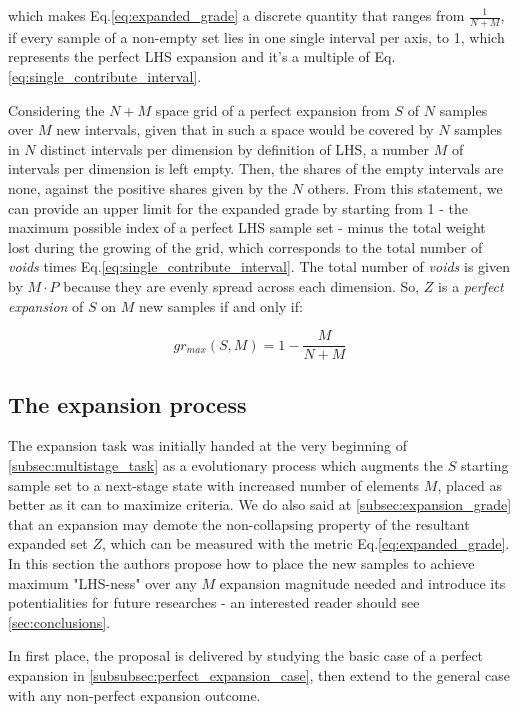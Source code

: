 \documentclass[12pt]{article}
\newcommand{\meqref}[1]{Eq.\ref{#1}}
\begin{document}
which makes \meqref{eq:expanded_grade} a discrete quantity that ranges from $\frac{1}{N+M}$, if every sample of a non-empty set lies in one single interval per axis, to 1, which represents the perfect LHS expansion and it's a multiple of \meqref{eq:single_contribute_interval}.

Considering the $N+M$ space grid of a perfect expansion from $S$ of $N$ samples over $M$ new intervals, given that in such a space would be covered by $N$ samples in $N$ distinct intervals per dimension by definition of LHS, a number $M$ of intervals per dimension is left empty. Then, the shares of the empty intervals are none, against the positive shares given by the $N$ others. From this statement, we can provide an upper limit for the expanded grade by starting from 1 - the maximum possible index of a perfect LHS sample set - minus the total weight lost during the growing of the grid, which corresponds to the total number of \textit{voids} times \meqref{eq:single_contribute_interval}. The total number of \textit{voids} is given by $M \cdot P$ because they are evenly spread across each dimension. So, $Z$ is a \textit{perfect expansion} of $S$ on $M$ new samples if and only if:

\begin{equation}
\label{eq:upper_limit_perfect_expansion}
gr_{max}(S, M) = 1 - \frac{M}{N+M}
\end{equation}


\subsection{The expansion process}
The expansion task was initially handed at the very beginning of  \cref{subsec:multistage_task} as a evolutionary process which augments the $S$ starting sample set to a next-stage state with increased number of elements $M$, placed as better as it can to maximize criteria. We do also said at \cref{subsec:expansion_grade} that an expansion may demote the non-collapsing property of the resultant expanded set $Z$, which can be measured with the metric \meqref{eq:expanded_grade}. 
In this section the authors propose how to place the new samples to achieve maximum "LHS-ness" over any $M$ expansion magnitude needed and introduce its potentialities for future researches - an interested reader should see \cref{sec:conclusions}.

In first place, the proposal is delivered by studying the basic case of a perfect expansion in \cref{subsubsec:perfect_expansion_case}, then extend to the general case with any non-perfect expansion outcome.
\end{document}

